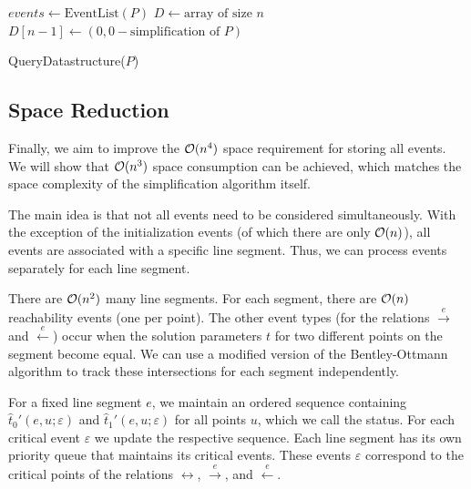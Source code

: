 \begin{algorithm}[ht]
  \DontPrintSemicolon
  \BlankLine
	\(events \gets \text{EventList}(P)\)\;
	\(D \gets \text{array of size } n\)\;
	\(D[n-1] \gets (0, 0-\text{simplification of } P)\) 
  \caption{QueryDatastructure(\(P\))}
  \label{algo:query-datastructure}
\end{algorithm}


\subsection{Space Reduction}\label{ssec:space-reduction-ds}
Finally, we aim to improve the \(\mathcal{O}(n^4)\) space requirement for storing all events. We will show that \(\mathcal{O}(n^3)\) space consumption can be achieved, which matches the space complexity of the simplification algorithm itself.

The main idea is that not all events need to be considered simultaneously. With the exception of the initialization events (of which there are only \(\mathcal{O}(n)\)), all events are associated with a specific line segment. Thus, we can process events separately for each line segment.

There are \(\mathcal{O}(n^2)\) many line segments. For each segment, there are \(\mathcal{O}(n)\) reachability events (one per point). The other event types (for the relations \(\overset e\rightarrow\) and \(\overset e\leftarrow\)) occur when the solution parameters \(t\) for two different points on the segment become equal. We can use a modified version of the Bentley-Ottmann algorithm to track these intersections for each segment independently.

For a fixed line segment \(e\), we maintain an ordered sequence containing \(\hat t_0'(e, u; \varepsilon)\) and \(\hat t_1'(e, u; \varepsilon)\) for all points \(u\), which we call the status. For each critical event \(\varepsilon\) we update the respective sequence. Each line segment has its own priority queue that maintains its critical events. These events \(\varepsilon\) correspond to the critical points of the relations \(\leftrightarrow\), \(\overset e\rightarrow\), and \(\overset e\leftarrow\). 

